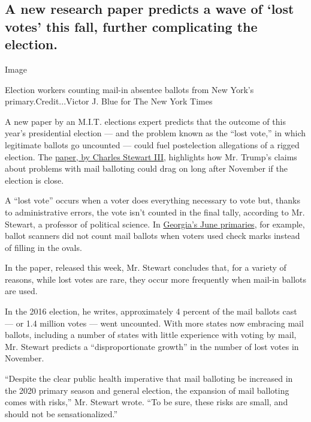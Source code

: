 \hypertarget{a-new-research-paper-predicts-a-wave-of-lost-votes-this-fall-further-complicating-the-election}{%
\subsection{A new research paper predicts a wave of `lost votes' this
fall, further complicating the
election.}\label{a-new-research-paper-predicts-a-wave-of-lost-votes-this-fall-further-complicating-the-election}}

Image

Election workers counting mail-in absentee ballots from New York's
primary.Credit...Victor J. Blue for The New York Times

A new paper by an M.I.T. elections expert predicts that the outcome of
this year's presidential election --- and the problem known as the
``lost vote,'' in which legitimate ballots go uncounted --- could fuel
postelection allegations of a rigged election. The
\href{https://papers.ssrn.com/sol3/papers.cfm?abstract_id=3660625}{paper,
by Charles Stewart III}, highlights how Mr. Trump's claims about
problems with mail balloting could drag on long after November if the
election is close.

A ``lost vote'' occurs when a voter does everything necessary to vote
but, thanks to administrative errors, the vote isn't counted in the
final tally, according to Mr. Stewart, a professor of political science.
In
\href{https://www.nytimes.com/2020/07/25/us/politics/georgia-election-voting-problems.html}{Georgia's
June primaries}, for example, ballot scanners did not count mail ballots
when voters used check marks instead of filling in the ovals.

In the paper, released this week, Mr. Stewart concludes that, for a
variety of reasons, while lost votes are rare, they occur more
frequently when mail-in ballots are used.

In the 2016 election, he writes, approximately 4 percent of the mail
ballots cast --- or 1.4 million votes --- went uncounted. With more
states now embracing mail ballots, including a number of states with
little experience with voting by mail, Mr. Stewart predicts a
``disproportionate growth'' in the number of lost votes in November.

``Despite the clear public health imperative that mail balloting be
increased in the 2020 primary season and general election, the expansion
of mail balloting comes with risks,'' Mr. Stewart wrote. ``To be sure,
these risks are small, and should not be sensationalized.''

